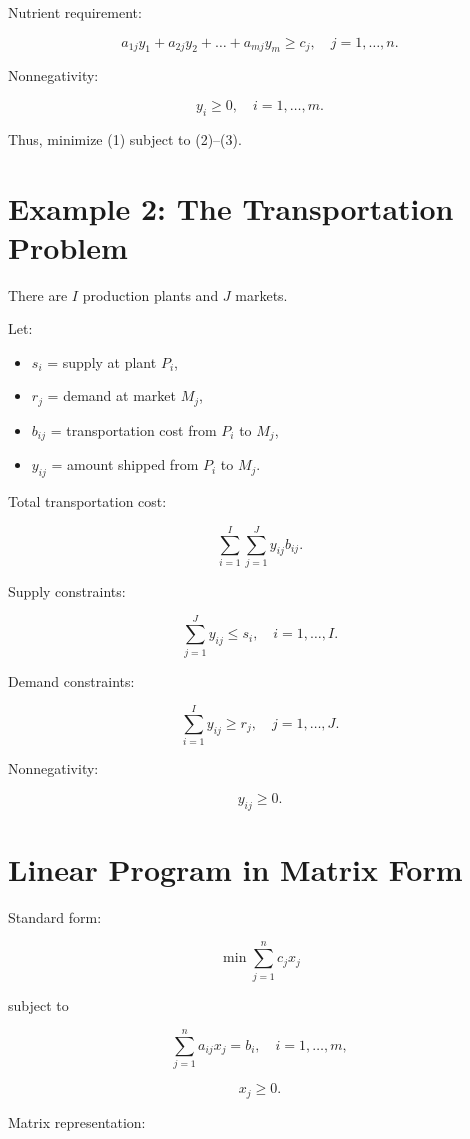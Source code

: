 \documentclass[12pt]{article}
\begin{document}
Nutrient requirement:

\[
a_{1j}y_1 + a_{2j}y_2 + \dots + a_{mj}y_m \ge c_j,
\quad j = 1,\dots,n.
\tag{2}
\]

Nonnegativity:

\[
y_i \ge 0, \quad i=1,\dots,m.
\tag{3}
\]

Thus, minimize (1) subject to (2)–(3).

\section{Example 2: The Transportation Problem}

There are $I$ production plants and $J$ markets.

Let:
\begin{itemize}
\item $s_i$ = supply at plant $P_i$,
\item $r_j$ = demand at market $M_j$,
\item $b_{ij}$ = transportation cost from $P_i$ to $M_j$,
\item $y_{ij}$ = amount shipped from $P_i$ to $M_j$.
\end{itemize}

Total transportation cost:

\[
\sum_{i=1}^{I} \sum_{j=1}^{J} y_{ij} b_{ij}.
\tag{4}
\]

Supply constraints:

\[
\sum_{j=1}^{J} y_{ij} \le s_i,
\quad i=1,\dots,I.
\tag{5}
\]

Demand constraints:

\[
\sum_{i=1}^{I} y_{ij} \ge r_j,
\quad j=1,\dots,J.
\tag{6}
\]

Nonnegativity:

\[
y_{ij} \ge 0.
\tag{7}
\]

\section{Linear Program in Matrix Form}

Standard form:

\[
\min \sum_{j=1}^{n} c_j x_j
\]

subject to

\[
\sum_{j=1}^{n} a_{ij} x_j = b_i,
\quad i=1,\dots,m,
\]

\[
x_j \ge 0.
\]

Matrix representation:
\end{document}
